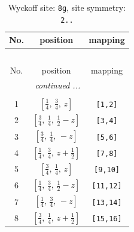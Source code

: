 \documentclass[fleqn,8pt]{jsarticle}
\begin{document}
\renewcommand{\arraystretch}{1.2}
\begin{longtable}{ccc}
\caption{Wyckoff site: {\tt 8g}, site symmetry: {\tt 2..}}
 \\
 \hline \hline
No. & position & mapping \\ \hline \endfirsthead

\multicolumn{2}{l}{\tablename\ \thetable{}} \\
 \hline \hline
No. & position & mapping \\ \hline \endhead

 \hline \hline
\multicolumn{2}{r}{\footnotesize\it continued ...} \\ \endfoot

 \hline \hline
\multicolumn{2}{r}{} \\ \endlastfoot

1 & $\left[ \frac{1}{4},\, \frac{3}{4},\, z \right]$ & {\tt [1,2]} \\ \hline
2 & $\left[ \frac{3}{4},\, \frac{1}{4},\, \frac{1}{2} - z \right]$ & {\tt [3,4]} \\ \hline
3 & $\left[ \frac{3}{4},\, \frac{1}{4},\, - z \right]$ & {\tt [5,6]} \\ \hline
4 & $\left[ \frac{1}{4},\, \frac{3}{4},\, z + \frac{1}{2} \right]$ & {\tt [7,8]} \\ \hline
5 & $\left[ \frac{3}{4},\, \frac{1}{4},\, z \right]$ & {\tt [9,10]} \\ \hline
6 & $\left[ \frac{1}{4},\, \frac{3}{4},\, \frac{1}{2} - z \right]$ & {\tt [11,12]} \\ \hline
7 & $\left[ \frac{1}{4},\, \frac{3}{4},\, - z \right]$ & {\tt [13,14]} \\ \hline
8 & $\left[ \frac{3}{4},\, \frac{1}{4},\, z + \frac{1}{2} \right]$ & {\tt [15,16]} \\
\end{longtable}
\renewcommand{\arraystretch}{1.2}
\end{document}
